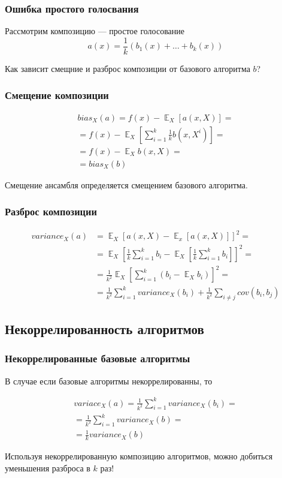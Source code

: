 \documentclass{beamer}
\DeclareMathOperator{\E}{\mathbb{E}}
\begin{document}
	\begin{frame}
		\frametitle{Ошибка простого голосвания}

		Рассмотрим композицию --- простое голосование
		\[
		a(x) = \frac{1}{k} \left( b_1(x) + \dots + b_k(x) \right)
		\]

		\vspace{15pt}

		Как зависит смещние и разброс композиции от базового алгоритма $b$?
	\end{frame}

	\begin{frame}
		\frametitle{Смещение композиции}

		\begin{align*}
			bias_X(a) = 
			f(x) - \E_X[a(x, X)] = \\
			= f(x) - \E_X \left[\sum_{i=1}^{k} \frac{1}{k} b(x, X^i) \right] = \\
			= f(x) - \E_X b(x, X) = \\
			= bias_X(b)
		\end{align*}

		Смещение ансамбля определяется смещением базового алгоритма.
	\end{frame}

	\begin{frame}
		\frametitle{Разброс композиции}

		\begin{align*}
			variance_X(a) & = \E_X [ a(x, X) - \E_x[a(x, X)] ]^2 = \\
			& = \E_X \left[ \frac{1}{k} \sum_{i=1}^{k} b_i - \E_X \left[ \frac{1}{k} \sum_{i=1}^{k} b_i \right] \right]^2 = \\
			& = \frac{1}{k^2} \E_X \left[ \sum_{i=1}^{k} \left( b_i - \E_X b_i \right) \right]^2 = \\
			& = \frac{1}{k^2} \sum_{i=1}^{k} variance_X(b_i) + 
			\frac{1}{k^2} \sum_{i \ne j} cov(b_i, b_j)
		\end{align*}
	\end{frame}

	\subsection{Некоррелированность алгоритмов}

	\begin{frame}
		\frametitle{Некоррелированные базовые алгоритмы}

		В случае если базовые алгоритмы некоррелированны, то

		\begin{align*}
			variace_X(a) = \frac{1}{k^2} \sum_{i=1}^{k} variance_X(b_i) = \\ 
			= \frac{1}{k^2} \sum_{i=1}^{k} variance_X(b) = \\
			= \frac{1}{k} variance_X(b)
		\end{align*}

		Используя некоррелированную композицию алгоритмов, можно добиться уменьшения разброса 
		в $k$ раз!
	\end{frame}
\end{document}
